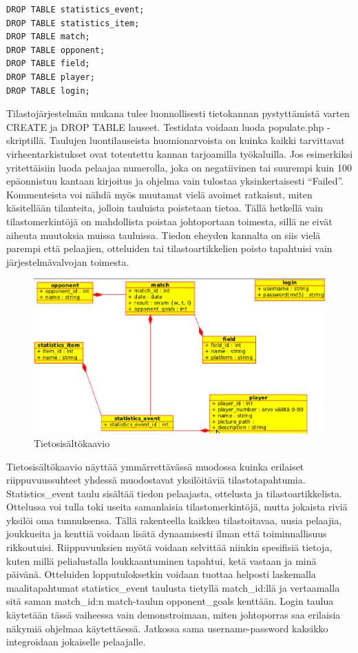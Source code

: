 \documentclass[12pt]{article} %
\begin{document}
\begin{lstlisting}[caption=Drop Table Statements]
DROP TABLE statistics_event;
DROP TABLE statistics_item;
DROP TABLE match;
DROP TABLE opponent;
DROP TABLE field;
DROP TABLE player;
DROP TABLE login;
\end{lstlisting}
Tilastojärjestelmän mukana tulee luonnollisesti tietokannan pystyttämistä varten CREATE ja DROP TABLE lauseet. Testidata voidaan luoda populate.php -skriptillä. Taulujen luontilauseista huomionarvoista on kuinka kaikki tarvittavat virheentarkistukset ovat toteutettu kannan tarjoamilla työkaluilla. Jos esimerkiksi yritettäisiin luoda pelaajaa numerolla, joka on negatiivinen tai suurempi kuin 100 epäonnistuu kantaan kirjoitus ja ohjelma vain tulostaa yksinkertaisesti ``Failed''. Kommenteista voi nähdä myös muutamat vielä avoimet ratkaisut, miten käsitellään tilanteita, jolloin tauluista poistetaan tietoa. Tällä hetkellä vain tilastomerkintöjä on mahdollista poistaa johtoportaan toimesta, sillä ne eivät aiheuta muutoksia muissa tauluissa. Tiedon eheyden kannalta on siis vielä parempi että pelaajien, otteluiden tai tilastoartikkelien poisto tapahtuisi vain järjestelmävalvojan toimesta.

\begin{figure}[h]
	\begin{left}
		\includegraphics[width=\textwidth]{kaavio.eps}
	\end{left}
	\caption{Tietosisältökaavio}
	\label{fig:kaavio}
\end{figure}
Tietosisältökaavio näyttää ymmärrettävässä muodossa kuinka erilaiset riippuvuussuhteet yhdessä muodostavat yksilöitäviä tilastotapahtumia. Statistics\_event taulu sisältää tiedon pelaajasta, ottelusta ja tilastoartikkelista. Ottelussa voi tulla toki useita samanlaisia tilastomerkintöjä, mutta jokaista riviä yksilöi oma tunnuksensa. Tällä rakenteella kaikkea tilastoitavaa, uusia pelaajia, joukkueita ja kenttiä voidaan lisätä dynaamisesti ilman että toiminnallisuus rikkoutuisi.  Riippuvuuksien myötä voidaan selvittää niinkin spesifisiä tietoja, kuten millä pelialustalla loukkaantuminen tapahtui, ketä vastaan ja minä päivänä. Otteluiden lopputuloksetkin voidaan tuottaa helposti laskemalla maalitapahtumat statistics\_event taulusta tietyllä match\_id:llä ja vertaamalla sitä saman match\_id:n match-taulun opponent\_goals kenttään. Login taulua käytetään tässä vaiheessa vain demonstroimaan, miten johtoporras saa erilaisia näkymiä ohjelmaa käytettäessä. Jatkossa sama username-password kaksikko integroidaan jokaiselle pelaajalle.
\end{document}
